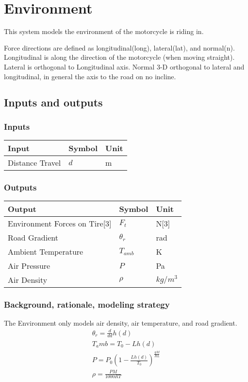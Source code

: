 \documentclass[../SimBALink.tex]{subfiles}
\begin{document}
\section{Environment} This system models the environment of the motorcycle is riding in.

Force directions are defined as longitudinal(long), lateral(lat), and normal(n). Longitudinal is along the direction of the motorcycle (when moving straight). Lateral is orthogonal to Longitudinal axis. Normal 3-D orthogonal to lateral and longitudinal, in general the axis to the road on no incline.

\subsection{Inputs and outputs}
	\subsubsection{Inputs}
	\begin{tabular}{ l | l | l  }
		Input					&	Symbol		&	Unit		\\	\hline
		Distance Travel			&	$d$			&	m
	\end{tabular}
	
	\subsubsection{Outputs}
	\begin{tabular}{ l | l | l  }
		Output							&	Symbol		&	Unit		\\	\hline
		Environment Forces on Tire[3]		&	$F_t$		&	N[3] \\
		Road Gradient						&	$\theta_r$	&	rad \\
		Ambient Temperature					&	$T_{amb}$	&  K \\
		Air Pressure						&	$P$  		& Pa \\
		Air Density 						&	$\rho$		& $kg/m^3$
	\end{tabular}

\subsubsection{Background, rationale, modeling strategy}
The Environment only models air density, air temperature, and road gradient.
	\begin{gather}
		\theta_r  = \frac{d}{dd} h(d) \\
		T_amb = T_0 - L h(d) \\
		P = P_0 \left( 1 - \frac{L h(d)}{T_0} \right)^{\frac{gM}{RL}}\\
		\rho = \frac{PM}{1000RT}  
\end{gather}
\end{document}
